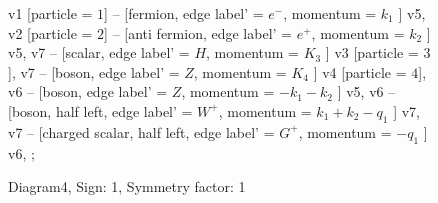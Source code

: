 \documentclass{revtex4}
\begin{document}
\begin{figure}[!htb]
\begin{center}
{    %
v1 [particle = \(1\)] -- [fermion, edge label' = \(e^{-}\), momentum = \(k_{1}\) ] v5, 
v2 [particle = \(2\)] -- [anti fermion, edge label' = \(e^{+}\), momentum = \(k_{2}\) ] v5, 
v7 -- [scalar, edge label' = \(H\), momentum = \(K_{3}\) ] v3 [particle = \(3\)], 
v7 -- [boson, edge label' = \(Z\), momentum = \(K_{4}\) ] v4 [particle = \(4\)], 
v6 -- [boson, edge label' = \(Z\), momentum = \(-k_{1} - k_{2}\) ] v5, 
v6 -- [boson, half left, edge label' = \(W^{+}\), momentum = \(k_{1} + k_{2} - q_{1}\) ] v7, 
v7 -- [charged scalar, half left, edge label' = \(G^{+}\), momentum = \(-q_{1}\) ] v6, 
};
\end{center}
\caption{Diagram4, Sign: 1, Symmetry factor: 1}
\end{figure}
\newpage
\end{document}
